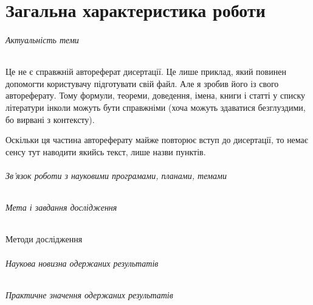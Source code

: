 \documentclass{vakaref}
\theoremstyle{plain}
\theoremstyle{definition}
\theoremstyle{remark}
\begin{document}
\maketitle


\part{Загальна характеристика роботи}

\paragraph{Актуальність теми}

Це не є справжній автореферат дисертації. Це лише приклад, який
повинен допомогти користувачу підготувати свій файл. Але я зробив
його із свого автореферату. Тому формули, теореми, доведення,
імена, книги і статті у списку літератури інколи можуть бути
справжніми (хоча можуть здаватися безглуздими, бо вирвані з
контексту).

Оскільки ця частина автореферату майже повторює вступ до
дисертації, то немає сенсу тут наводити якийсь текст, лише назви
пунктів.

\paragraph{Зв'язок роботи з науковими програмами, планами, темами}

\paragraph{Мета і завдання дослідження}

\subparagraph{Методи дослідження}

\paragraph{Наукова новизна одержаних результатів}

\paragraph{Практичне значення одержаних результатів}
\end{document}
